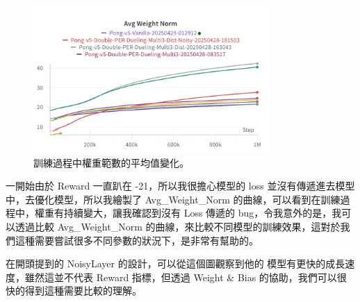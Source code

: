\begin{figure}[htbp]
    \centering
    \includegraphics[width=0.8\textwidth]{figures/Avg_Weight_Norm.png}
    \caption{訓練過程中權重範數的平均值變化。}
    \label{fig:weight_norm}
\end{figure}

一開始由於 Reward 一直趴在 -21，所以我很擔心模型的 loss 並沒有傳遞進去模型中，去優化模型，所以我繪製了 Avg\_Weight\_Norm 的曲線，可以看到在訓練過程中，權重有持續變大，讓我確認到沒有 Loss 傳遞的 bug，令我意外的是，我可以透過比較 Avg\_Weight\_Norm 的曲線，來比較不同模型的訓練效果，這對於我們這種需要嘗試很多不同參數的狀況下，是非常有幫助的。

在開頭提到的 NoisyLayer 的設計，可以從這個圖觀察到他的 模型有更快的成長速度，雖然這並不代表 Reward 指標，但透過 Weight \& Bias 的協助，我們可以很快的得到這種需要比較的理解。
